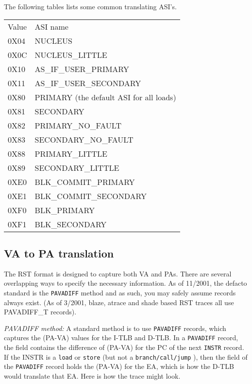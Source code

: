 \documentclass[10pt]{article}
\begin{document}
\begin{rqitemize}{0em}
The following tables lists some common translating ASI's.

\begin{tabular}{|l|l|}
  Value & ASI name  \\
  0X04 & NUCLEUS  \\
  0X0C & NUCLEUS\_LITTLE \\
  0X10 & AS\_IF\_USER\_PRIMARY  \\
  0X11 & AS\_IF\_USER\_SECONDARY \\
  0X80 & PRIMARY (the default ASI for all loads) \\
  0X81 & SECONDARY \\
  0X82 & PRIMARY\_NO\_FAULT \\
  0X83 & SECONDARY\_NO\_FAULT \\
  0X88 & PRIMARY\_LITTLE \\
  0X89 & SECONDARY\_LITTLE \\
  0XE0 & BLK\_COMMIT\_PRIMARY \\
  0XE1 & BLK\_COMMIT\_SECONDARY \\
  0XF0 & BLK\_PRIMARY \\
  0XF1 & BLK\_SECONDARY \\
\end{tabular}

\end{rqitemize}

\subsection{VA to PA translation}

The RST format is designed to capture both VA and PAs.  There are
several overlapping ways to specify the necessary information.  As of
11/2001, the defacto standard is the \texttt{PAVADIFF} method and as
such, you may safely assume  records always exist.
(As of 3/2001, blaze, atrace and shade based RST traces all use
PAVADIFF\_T records).  

\textsl{PAVADIFF method:} A standard method is to use \texttt{PAVADIFF}
records, which captures the (PA-VA) values for the I-TLB and D-TLB.  In
a \texttt{PAVADIFF} record, the  field contains the
difference of (PA-VA) for the PC of the next \texttt{INSTR} record.  If
the INSTR is a \texttt{load} or \texttt{store} (but not a
\texttt{branch/call/jump} ), then the  field of the
\texttt{PAVADIFF} record holds the (PA-VA) for the EA, which is how the
D-TLB would translate that EA.  Here is how the trace might look.
\end{document}
